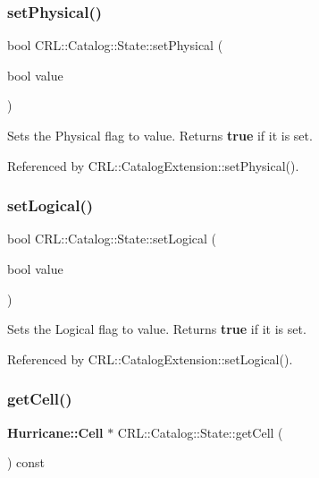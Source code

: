 \subsubsection{\texorpdfstring{set\+Physical()}{setPhysical()}}
{\footnotesize\ttfamily bool C\+R\+L\+::\+Catalog\+::\+State\+::set\+Physical (\begin{DoxyParamCaption}\item[{bool}]{value }\end{DoxyParamCaption})\hspace{0.3cm}{\ttfamily [inline]}}

Sets the Physical flag to {\ttfamily value}. Returns {\bfseries true} if it is set. 

Referenced by C\+R\+L\+::\+Catalog\+Extension\+::set\+Physical().

\mbox{\label{classCRL_1_1Catalog_1_1State_af41327abeb4e7646ef5cafabe8eeabd0}} 
\subsubsection{\texorpdfstring{set\+Logical()}{setLogical()}}
{\footnotesize\ttfamily bool C\+R\+L\+::\+Catalog\+::\+State\+::set\+Logical (\begin{DoxyParamCaption}\item[{bool}]{value }\end{DoxyParamCaption})\hspace{0.3cm}{\ttfamily [inline]}}

Sets the Logical flag to {\ttfamily value}. Returns {\bfseries true} if it is set. 

Referenced by C\+R\+L\+::\+Catalog\+Extension\+::set\+Logical().

\mbox{\label{classCRL_1_1Catalog_1_1State_a0cc5ef54176f8207ef4e723eed62c35e}} 
\subsubsection{\texorpdfstring{get\+Cell()}{getCell()}}
{\footnotesize\ttfamily \textbf{ Hurricane\+::\+Cell} $\ast$ C\+R\+L\+::\+Catalog\+::\+State\+::get\+Cell (\begin{DoxyParamCaption}{ }\end{DoxyParamCaption}) const\hspace{0.3cm}{\ttfamily [inline]}}

